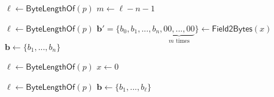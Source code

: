 \begin{algorithm}[ht]
\DontPrintSemicolon
    \caption{$\mathsf{Bytes2Point} (\boldsymbol{b})$}
    \label{alg: bytes to point}

    $\ell \gets \mathsf{ByteLengthOf}(p)$ \;
    $m \gets \ell - n - 1$ \;
\end{algorithm}

\begin{algorithm}[ht]
\DontPrintSemicolon
    \caption{$\mathsf{Point2Bytes} (M)$}
    \label{alg: point to bytes}

    $\ell \gets \mathsf{ByteLengthOf}(p)$ \;
    $\boldsymbol{b}' = \{ b_0, b_1, ..., b_n, \underbrace{00, ..., 00}_\text{$m$ times} \} \gets \mathsf{Field2Bytes}(x)$ 
    $\boldsymbol{b} \gets \{ b_1, ..., b_n \}$ \;
     
\end{algorithm}

\begin{algorithm}[ht]
\DontPrintSemicolon
    \caption{$\mathsf{Bytes2Field} (\boldsymbol{b})$}
    \label{alg: bytes to field}

    $\ell \gets \mathsf{ByteLengthOf}(p)$ \;
    $x \gets 0$ \;
     
\end{algorithm}

\begin{algorithm}[ht]
\DontPrintSemicolon
    \caption{$\mathsf{Field2Bytes} (x)$}
    \label{alg: field to bytes}

    $\ell \gets \mathsf{ByteLengthOf}(p)$ \;
    $\boldsymbol{b} \gets \{ b_1, ..., b_\ell \}$ \;
     
\end{algorithm}


